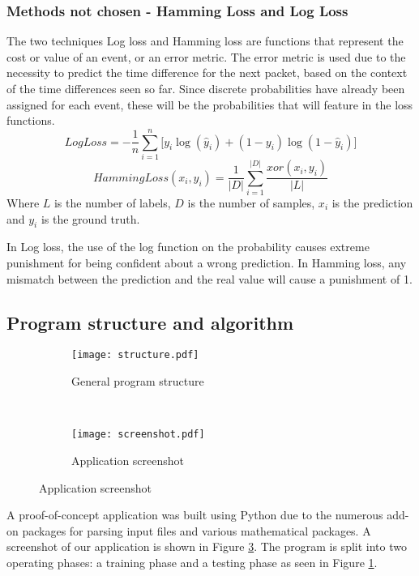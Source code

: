 \documentclass[13pt,journal,compsoc,onecolumn]{IEEEtran}
\begin{document}
\subsubsection{Methods not chosen - Hamming Loss and Log Loss}
The two techniques Log loss \cite{Bis06} and Hamming loss \cite{Tso07, Ham50} are functions that represent the cost or value of an event, or an error metric.
The error metric is used due to the necessity to predict the time difference for the next packet, based on the context of the time differences seen so far.
Since discrete probabilities have already been assigned for each event, these will be the probabilities that will feature in the loss functions.
\begin{equation}\label{eq:ll}
LogLoss =  - \frac{1}{n}\sum\limits_{i = 1}^n {[{y_i}\log ({{\hat y}_i}) + (1 - {y_i})\log } (1 - {\hat y_i})]
\end{equation}
\begin{equation}\label{eq:hl}
HammingLoss({x_i},{y_i}) = \frac{1}{{\left| D \right|}}\sum\limits_{i = 1}^{\left| D \right|} {\frac{{xor({x_i},{y_i})}}{{\left| L \right|}}}
\end{equation}
Where $L$ is the number of labels, $D$ is the number of samples, $x_i$ is the prediction and $y_i$ is the ground truth.

In Log loss, the use of the log function on the probability causes extreme punishment for being confident about a wrong prediction.
In Hamming loss, any mismatch between the prediction and the real value will cause a punishment of 1.

\subsection{Program structure and algorithm}
\begin{figure}[h!]
 \centering
 \begin{subfigure}[b]{0.6\textwidth}
  \centering
  \texttt{[image: structure.pdf]}
  \caption{General program structure\label{fig:progstruct}}
 \end{subfigure} 
 ~~~
 \begin{subfigure}[b]{0.3\textwidth}
  \centering
  \texttt{[image: screenshot.pdf]}
  \caption{Application screenshot\label{fig:progscreenshot}}
  \end{subfigure}
\end{figure} 


A proof-of-concept application was built using Python due to the numerous add-on packages for parsing input files and various mathematical packages. A screenshot of our application is shown in Figure \ref{fig:progscreenshot}.
The program is split into two operating phases: a training phase and a testing phase as seen in Figure \ref{fig:progstruct}.
\end{document}
